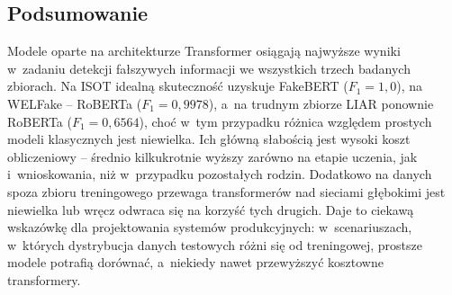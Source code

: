 \subsection{Podsumowanie}
\label{sec:wyniki_bert_podsum}

Modele oparte na architekturze Transformer osiągają najwyższe wyniki
w~zadaniu detekcji fałszywych informacji we wszystkich trzech badanych
zbiorach. Na ISOT idealną skuteczność uzyskuje FakeBERT (\(F_1 = 1{,}0\)),
na WELFake -- RoBERTa (\(F_1 = 0{,}9978\)), a~na trudnym zbiorze LIAR
ponownie RoBERTa (\(F_1 = 0{,}6564\)), choć w~tym przypadku różnica
względem prostych modeli klasycznych jest niewielka. Ich główną
słabością jest wysoki koszt obliczeniowy -- średnio kilkukrotnie
wyższy zarówno na etapie uczenia, jak i~wnioskowania, niż w~przypadku
pozostałych rodzin. Dodatkowo na danych spoza zbioru treningowego
przewaga transformerów nad sieciami głębokimi jest niewielka lub
wręcz odwraca się na korzyść tych drugich. Daje to ciekawą wskazówkę
dla projektowania systemów produkcyjnych: w~scenariuszach, w~których
dystrybucja danych testowych różni się od treningowej, prostsze
modele potrafią dorównać, a~niekiedy nawet przewyższyć kosztowne
transformery.

